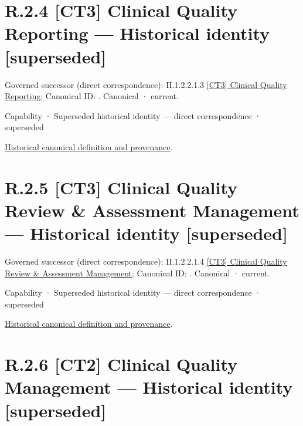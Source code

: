 \section*{R.2.4 [CT3] Clinical Quality Reporting — Historical identity [superseded]}
\label{navigation:R.2.4}

{\small Governed successor (direct correspondence): II.1.2.2.1.3 \hyperref[element:70f34839c23042d59469e6ef96944057]{[CT3] Clinical Quality Reporting}; Canonical ID: \texttt{}. Canonical · current.}\par
\label{element:e5812fcdf3f5465b9b1d8ba536075c5f}
{\small Capability · Superseded historical identity — direct correspondence · superseded}\par
\href{../../../../continuum/strategy/capability/e5812fcdf3f5465b9b1d8ba536075c5f.md}{Historical canonical definition and provenance}.\par
\section*{R.2.5 [CT3] Clinical Quality Review \& Assessment Management — Historical identity [superseded]}
\label{navigation:R.2.5}

{\small Governed successor (direct correspondence): II.1.2.2.1.4 \hyperref[element:8318c35b302b4dcaa0e795fbfdc93e3b]{[CT3] Clinical Quality Review \& Assessment Management}; Canonical ID: \texttt{}. Canonical · current.}\par
\label{element:4b17ec92f0af4c4b9556912dbdd0f29f}
{\small Capability · Superseded historical identity — direct correspondence · superseded}\par
\href{../../../../continuum/strategy/capability/4b17ec92f0af4c4b9556912dbdd0f29f.md}{Historical canonical definition and provenance}.\par
\section*{R.2.6 [CT2] Clinical Quality Management — Historical identity [superseded]}
\label{navigation:R.2.6}

